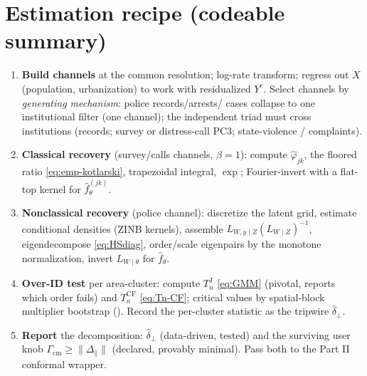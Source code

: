 \documentclass[11pt]{article}
\theoremstyle{definition}
\newcommand{\ecf}{\widehat{\varphi}}
\newcommand{\Th}{\theta}
\newcommand{\lat}{\Th}
\newcommand{\Gcm}{\Gamma_{\mathrm{cm}}}
\newcommand{\Dpar}{\Delta_{\parallel}}
\begin{document}
\section{Estimation recipe (codeable summary)}\label{sec:recipe}

\begin{enumerate}[leftmargin=1.6em]
\item \textbf{Build channels} at the common resolution; log-rate transform;
regress out $X$ (population, urbanization) to work with residualized
$Y^c$. Select channels by \emph{generating mechanism}: police records/arrests/
cases collapse to one institutional filter (one channel); the independent triad
must cross institutions (records; survey or distress-call PC3; state-violence /
complaints).
\item \textbf{Classical recovery} (survey/calls channels, $\beta=1$): compute
$\ecf_{jk}$, the floored ratio \eqref{eq:emp-kotlarski}, trapezoidal integral,
$\exp$; Fourier-invert with a flat-top kernel for $\widehat f_\lat^{(jk)}$.
\item \textbf{Nonclassical recovery} (police channel): discretize the latent
grid, estimate conditional densities (ZINB kernels), assemble
$L_{W,y\mid Z}(L_{W\mid Z})^{-1}$, eigendecompose \eqref{eq:HSdiag}, order/scale
eigenpairs by the monotone normalization, invert $L_{W\mid\lat}$ for
$\widehat f_\lat$.
\item \textbf{Over-ID test} per area-cluster: compute $T_n^{\mathrm J}$
\eqref{eq:GMM} (pivotal, reports which order fails) and $T_n^{\mathrm{CF}}$
\eqref{eq:Tn-CF}; critical values by spatial-block multiplier bootstrap
(). Record the per-cluster statistic as the tripwire
$\widehat\delta_\perp$.
\item \textbf{Report} the decomposition: $\widehat\delta_\perp$ (data-driven,
tested) and the surviving user knob $\Gcm\ge\|\Dpar\|$ (declared, provably
minimal). Pass both to the Part II conformal wrapper.
\end{enumerate}

\end{document}
